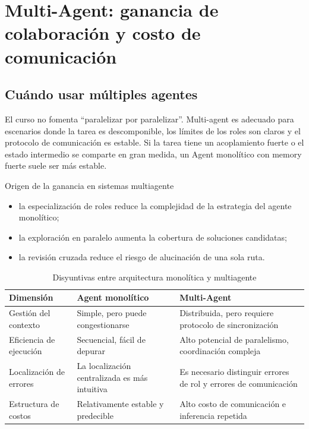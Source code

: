 \section{Multi-Agent: ganancia de colaboración y costo de comunicación}

\subsection{Cuándo usar múltiples agentes}
El curso no fomenta ``paralelizar por paralelizar''. Multi-agent es adecuado para escenarios donde la tarea es descomponible, los límites de los roles son claros y el protocolo de comunicación es estable. Si la tarea tiene un acoplamiento fuerte o el estado intermedio se comparte en gran medida, un Agent monolítico con memory fuerte suele ser más estable.

\begin{knowledgebox}{Origen de la ganancia en sistemas multiagente}
\begin{itemize}
    \item la especialización de roles reduce la complejidad de la estrategia del agente monolítico;
    \item la exploración en paralelo aumenta la cobertura de soluciones candidatas;
    \item la revisión cruzada reduce el riesgo de alucinación de una sola ruta.
\end{itemize}
\end{knowledgebox}

\begin{table}[H]
\centering
\begin{tabular}{p{3.3cm}p{3.8cm}p{3.9cm}}
\toprule
\textbf{Dimensión} & \textbf{Agent monolítico} & \textbf{Multi-Agent} \\
\midrule
Gestión del contexto & Simple, pero puede congestionarse & Distribuida, pero requiere protocolo de sincronización \\
Eficiencia de ejecución & Secuencial, fácil de depurar & Alto potencial de paralelismo, coordinación compleja \\
Localización de errores & La localización centralizada es más intuitiva & Es necesario distinguir errores de rol y errores de comunicación \\
Estructura de costos & Relativamente estable y predecible & Alto costo de comunicación e inferencia repetida \\
\bottomrule
\end{tabular}
\caption{Disyuntivas entre arquitectura monolítica y multiagente}
\end{table}

